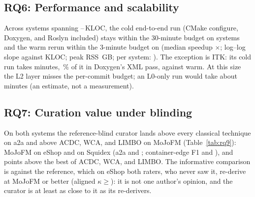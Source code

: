 \subsection{RQ6: Performance and scalability}
\label{sec:rq7}

Across \rqSevenSystems{} systems spanning \rqSevenMinKloc{}--\rqSevenMaxKloc{}\,KLOC, the cold
end-to-end run (CMake configure, Doxygen, and Roslyn included) stays within the 30-minute budget
on \rqSevenColdBudget{} systems and the warm rerun within the 3-minute budget on
\rqSevenWarmBudget{} (median speedup \rqSevenMedianSpeedup$\times$; log--log slope
\rqSevenScalingSlope{} against KLOC; peak RSS \rqSevenMaxPeakRssGb{}\,GB; per system:
\trPerf{}). The exception is ITK: its cold run takes \rqSevenItkColdMin{} minutes,
\rqSevenItkDoxygenSharePct{}\,\% of it in Doxygen's XML pass, against \rqSevenItkWarmMin{} warm.
At this size the L2 layer misses the per-commit budget; an L0-only run would take about
\rqSevenItkLZeroImpliedMin{} minutes (an estimate, not a measurement).

\subsection{RQ7: Curation value under blinding}
\label{sec:rq9}


On both systems the reference-blind curator lands above every classical technique on a2a and
above ACDC, WCA, and LIMBO on MoJoFM (Table~\ref{tab:rq9}): \rqNineEshopCuratorMoJo{} MoJoFM on eShop and \rqNineSquidexCuratorMoJo{} on
Squidex (a2a \rqNineEshopCuratorAtoA{} and \rqNineSquidexCuratorAtoA{}; container-edge F1
\rqNineEshopCuratorEdgeFone{} and \rqNineSquidexCuratorEdgeFone{}), \rqNineEshopOverBestSarMoJo{}
and \rqNineSquidexOverBestSarMoJo{} points above the best of ACDC, WCA, and LIMBO. The
informative comparison is against the reference, which on eShop
both raters, who never saw it, re-derive at \rqNineEshopRaterRefMoJoMin{} MoJoFM or better
(aligned $\kappa\ge$\rqNineEshopRaterRefKappaAlignedMin{}): it is not one author's opinion, and
the curator is at least as close to it as its re-derivers.

